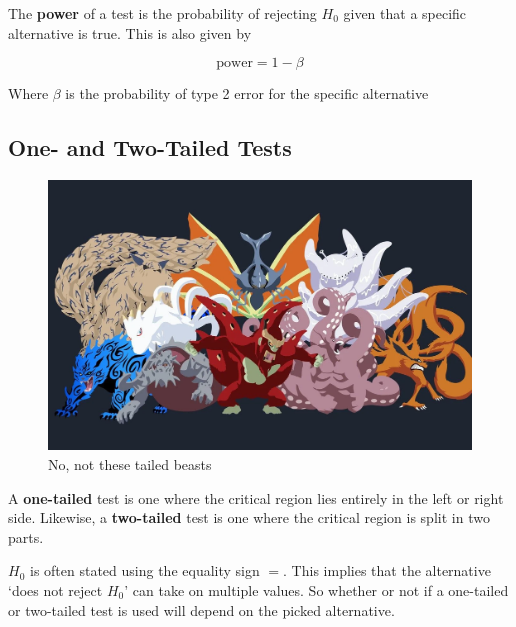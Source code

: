 \documentclass[10pt]{article}
\begin{document}
\begin{definition}
	The \textbf{power} of a test is the probability of rejecting $ H_0 $ given that a specific alternative is true. 
	This is also given by 

	\begin{equation}
		\text{power} = 1 - \beta
	\end{equation}

	Where $ \beta $ is the probability of type 2 error for the specific alternative
	



\end{definition}





\subsection{One- and Two-Tailed Tests}

\begin{blockquote}
	\begin{figure}[H]
		\centering
		\includegraphics[width=0.8\linewidth]{img/tailed_beasts.png}
		\caption{No, not these tailed beasts}
	\end{figure}
\end{blockquote}


A \textbf{one-tailed} test is one where the critical region lies entirely in the left or right side.
Likewise, a \textbf{two-tailed} test is one where the critical region is split in two parts.





\begin{remark}
	$ H_0 $  is often stated using the equality sign $ = $.
	This implies that the alternative `does not reject $ H_0 $' can take on multiple values. 
	So whether or not if a one-tailed or two-tailed test is used will depend on the picked alternative.
\end{remark}
\end{document}
